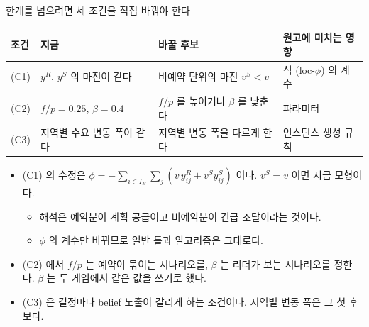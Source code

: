 \documentclass[aspectratio=169,11pt]{beamer}
\begin{document}
\begin{frame}{한계를 넘으려면 세 조건을 직접 바꿔야 한다}
\begin{center}
\small
\begin{tabular}{llll}
\toprule
조건 & 지금 & 바꿀 후보 & 원고에 미치는 영향\\
\midrule
(C1) & $y^{R}$, $y^{S}$ 의 마진이 같다 & 비예약 단위의 마진 $v^{S} < v$ & 식 (loc-$\phi$) 의 계수\\
(C2) & $f/p = 0.25$, $\beta = 0.4$ & $f/p$ 를 높이거나 $\beta$ 를 낮춘다 & 파라미터\\
(C3) & 지역별 수요 변동 폭이 같다 & 지역별 변동 폭을 다르게 한다 & 인스턴스 생성 규칙\\
\bottomrule
\end{tabular}
\end{center}
\begin{itemize}
  \item (C1) 의 수정은 $\phi = -\sum_{i \in I_B}\sum_j (v\,y^{R}_{ij} + v^{S} y^{S}_{ij})$ 이다. $v^{S} = v$ 이면 지금 모형이다.
  \begin{itemize}
    \item 해석은 예약분이 계획 공급이고 비예약분이 긴급 조달이라는 것이다.
    \item $\phi$ 의 계수만 바뀌므로 일반 틀과 알고리즘은 그대로다.
  \end{itemize}
  \item (C2) 에서 $f/p$ 는 예약이 묶이는 시나리오를, $\beta$ 는 리더가 보는 시나리오를 정한다. $\beta$ 는 두 게임에서 같은 값을 쓰기로 했다.
  \item (C3) 은 결정마다 belief 노출이 갈리게 하는 조건이다. 지역별 변동 폭은 그 첫 후보다.
\end{itemize}
\end{frame}
\end{document}
